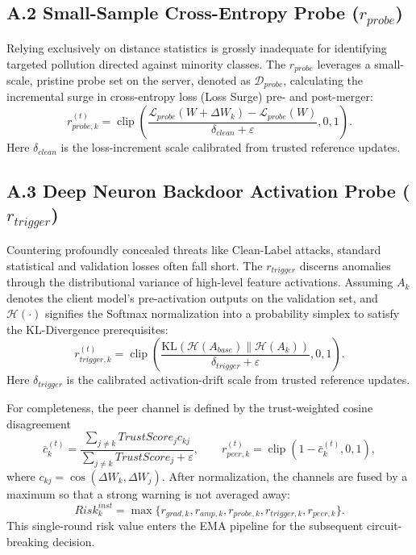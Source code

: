 \documentclass[11pt, a4paper]{article}
\begin{document}
\subsection{A.2 Small-Sample Cross-Entropy Probe \texorpdfstring{($r_{probe}$)}{(r-probe)}}
Relying exclusively on distance statistics is grossly inadequate for identifying targeted pollution directed against minority classes. The $r_{probe}$ leverages a small-scale, pristine probe set on the server, denoted as $\mathcal{D}_{probe}$, calculating the incremental surge in cross-entropy loss (Loss Surge) pre- and post-merger:
\begin{equation}
    r_{probe,k}^{(t)}=\operatorname{clip}\!\left(
    \frac{\mathcal{L}_{probe}(W+\Delta W_k)-\mathcal{L}_{probe}(W)}
    {\delta_{clean}+\varepsilon},0,1\right).
\end{equation}
Here $\delta_{clean}$ is the loss-increment scale calibrated from trusted reference updates.

\subsection{A.3 Deep Neuron Backdoor Activation Probe \texorpdfstring{($r_{trigger}$)}{(r-trigger)}}
Countering profoundly concealed threats like Clean-Label attacks, standard statistical and validation losses often fall short. The $r_{trigger}$ discerns anomalies through the distributional variance of high-level feature activations. Assuming $A_k$ denotes the client model's pre-activation outputs on the validation set, and $\mathcal{H}(\cdot)$ signifies the Softmax normalization into a probability simplex to satisfy the KL-Divergence prerequisites:
\begin{equation}
    r_{trigger,k}^{(t)}=\operatorname{clip}\!\left(
    \frac{\mathrm{KL}(\mathcal{H}(A_{base})\|\mathcal{H}(A_k))}
    {\delta_{trigger}+\varepsilon},0,1\right).
\end{equation}
Here $\delta_{trigger}$ is the calibrated activation-drift scale from trusted reference updates.

For completeness, the peer channel is defined by the trust-weighted cosine disagreement
\begin{equation}
 \bar c_k^{(t)}=\frac{\sum_{j\ne k}TrustScore_j c_{kj}}
 {\sum_{j\ne k}TrustScore_j+\varepsilon},\qquad
 r_{peer,k}^{(t)}=\operatorname{clip}(1-\bar c_k^{(t)},0,1),
\end{equation}
where $c_{kj}=\cos(\Delta W_k,\Delta W_j)$. After normalization, the channels are fused by a maximum so that a strong warning is not averaged away:
\begin{equation}
 Risk_k^{inst}=\max\{r_{grad,k},r_{amp,k},r_{probe,k},r_{trigger,k},r_{peer,k}\}.
\end{equation}
This single-round risk value enters the EMA pipeline for the subsequent circuit-breaking decision.
\end{document}
